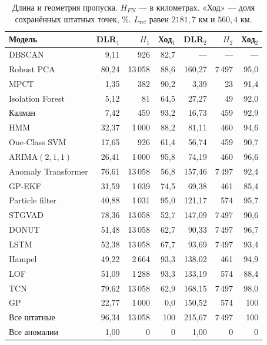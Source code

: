 \documentclass[a4paper,12pt]{report}
\begin{document}
\begin{table}[H]
\centering
\caption{Длина и геометрия пропуска. \(H_{FN}\) --- в километрах. «Ход» --- доля сохранённых штатных точек, \%. \(L_{\mathrm{ref}}\) равен \(2181{,}7\) км и \(560{,}4\) км.}
\footnotesize
\singlespacing
\setlength{\tabcolsep}{3.5pt}
\begin{tabular}{@{}lrrrrrr@{}}
\toprule
Модель & DLR\(_1\) & \(H_1\) & Ход\(_1\) & DLR\(_2\) & \(H_2\) & Ход\(_2\) \\
\midrule
DBSCAN & 9,11 & 926 & 82,7 & --- & --- & --- \\
Robust PCA & 80,24 & 13\,058 & 88,6 & 160,27 & 7\,497 & 95,0 \\
MPCT & 1,35 & 382 & 90,2 & 3,39 & 23 & 91,4 \\
Isolation Forest & 5,12 & 81 & 64,5 & 27,27 & 49 & 92,0 \\
Калман & 7,42 & 459 & 93,2 & 16,73 & 459 & 92,9 \\
HMM & 32,37 & 1\,000 & 88,2 & 81,11 & 460 & 94,6 \\
One-Class SVM & 17,65 & 926 & 61,4 & 56,74 & 459 & 90,7 \\
ARIMA\((2,1,1)\) & 26,41 & 1\,000 & 95,8 & 74,19 & 460 & 96,6 \\
Anomaly Transformer & 76,61 & 13\,058 & 56,8 & 157,46 & 7\,497 & 92,4 \\
GP-EKF & 31,59 & 1\,039 & 74,5 & 69,38 & 461 & 85,4 \\
Particle filter & 40,88 & 1\,031 & 95,0 & 121,17 & 574 & 95,7 \\
STGVAD & 78,36 & 13\,058 & 52,7 & 147,09 & 7\,497 & 90,6 \\
DONUT & 51,48 & 13\,058 & 62,7 & 90,33 & 7\,497 & 96,7 \\
LSTM & 52,38 & 13\,058 & 67,7 & 93,69 & 7\,497 & 93,4 \\
Hampel & 49,22 & 2\,664 & 93,3 & 138,02 & 461 & 94,9 \\
LOF & 51,09 & 1\,288 & 93,3 & 133,19 & 574 & 88,4 \\
TCN & 79,62 & 13\,058 & 62,9 & 168,15 & 7\,497 & 98,0 \\
GP & 22,77 & 1\,000 & 0,0 & 150,52 & 574 & 100 \\
Все штатные & 96,34 & 13\,058 & 100 & 215,67 & 7\,497 & 100 \\
Все аномалии & 1,00 & 0 & 0 & 1,00 & 0 & 0 \\
\bottomrule
\end{tabular}
\end{table}
\end{document}
